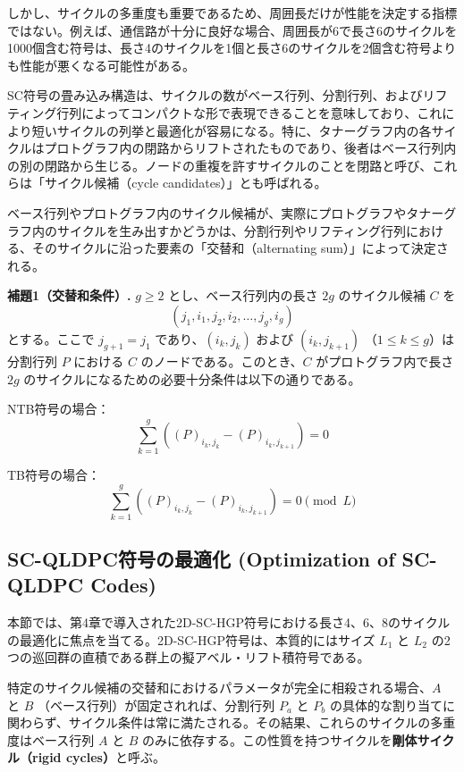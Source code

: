 \documentclass[a4paper,11pt]{article}
\begin{document}
しかし、サイクルの多重度も重要であるため、周囲長だけが性能を決定する指標ではない。例えば、通信路が十分に良好な場合、周囲長が6で長さ6のサイクルを1000個含む符号は、長さ4のサイクルを1個と長さ6のサイクルを2個含む符号よりも性能が悪くなる可能性がある。

SC符号の畳み込み構造は、サイクルの数がベース行列、分割行列、およびリフティング行列によってコンパクトな形で表現できることを意味しており、これにより短いサイクルの列挙と最適化が容易になる。特に、タナーグラフ内の各サイクルはプロトグラフ内の閉路からリフトされたものであり、後者はベース行列内の別の閉路から生じる。ノードの重複を許すサイクルのことを閉路と呼び、これらは「サイクル候補（cycle candidates）」とも呼ばれる。

ベース行列やプロトグラフ内のサイクル候補が、実際にプロトグラフやタナーグラフ内のサイクルを生み出すかどうかは、分割行列やリフティング行列における、そのサイクルに沿った要素の「交替和（alternating sum）」によって決定される。

\textbf{補題1（交替和条件）.}
$g \ge 2$ とし、ベース行列内の長さ $2g$ のサイクル候補 $C$ を
\[
  (j_1, i_1, j_2, i_2, \dots, j_g, i_g)
\]
とする。ここで $j_{g+1}=j_1$ であり、$(i_k, j_k)$ および $(i_k, j_{k+1})$ （$1 \le k \le g$）は分割行列 $P$ における $C$ のノードである。このとき、$C$ がプロトグラフ内で長さ $2g$ のサイクルになるための必要十分条件は以下の通りである。

NTB符号の場合：
\begin{equation}
\sum_{k=1}^g ((P)_{i_k, j_k} - (P)_{i_k, j_{k+1}}) = 0
\end{equation}

TB符号の場合：
\begin{equation}
\sum_{k=1}^g ((P)_{i_k, j_k} - (P)_{i_k, j_{k+1}}) = 0 \pmod L
\end{equation}

\subsection{SC-QLDPC符号の最適化 (Optimization of SC-QLDPC Codes)}
本節では、第4章で導入された2D-SC-HGP符号における長さ4、6、8のサイクルの最適化に焦点を当てる。2D-SC-HGP符号は、本質的にはサイズ $L_1$ と $L_2$ の2つの巡回群の直積である群上の擬アベル・リフト積符号である。

特定のサイクル候補の交替和におけるパラメータが完全に相殺される場合、$A$ と $B$ （ベース行列）が固定されれば、分割行列 $P_a$ と $P_b$ の具体的な割り当てに関わらず、サイクル条件は常に満たされる。その結果、これらのサイクルの多重度はベース行列 $A$ と $B$ のみに依存する。この性質を持つサイクルを\textbf{剛体サイクル（rigid cycles）}と呼ぶ。
\end{document}
